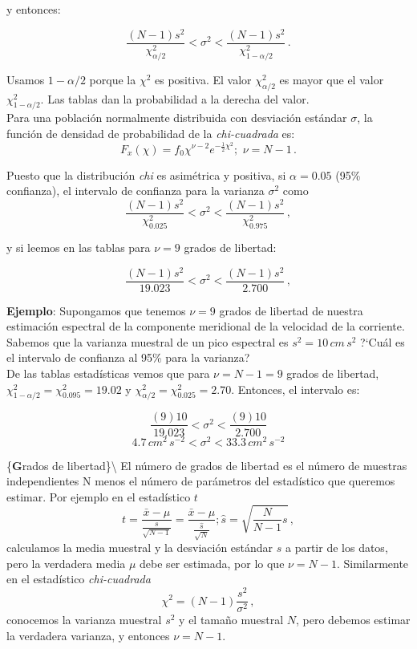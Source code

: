 \documentclass[
]{agujournal2019}
\begin{document}
y entonces:

\[\frac{(N-1)s^2}{\chi^2_{\alpha/2}}<\sigma^2<\frac{(N-1)s^2}{\chi^2_{1-\alpha/2}}\,.\]

\begin{center}
\end{center}

Usamos \(1-{\alpha/2}\) porque la \(\chi^2\) es positiva. El valor
\(\chi^2_{\alpha/2}\) es mayor que el valor \(\chi^2_{1-\alpha/2}\). Las
tablas dan la probabilidad a la derecha del valor.\\
Para una población normalmente distribuida con desviación estándar
\(\sigma\), la función de densidad de probabilidad de la
\emph{chi-cuadrada} es:
\[F_x(\chi)=f_0\chi^{\nu-2}e^{-\frac{1}{2}\chi^2};\,\,\nu=N-1\,.\]

Puesto que la distribución \emph{chi} es asimétrica y positiva, si
\(\alpha=0.05\) (95\% confianza), el intervalo de confianza para la
varianza \(\sigma^2\) como
\[\frac{(N-1)s^2}{\chi^2_{0.025}}<\sigma^2<\frac{(N-1)s^2}{\chi^2_{0.975}}\,,\]

y si leemos en las tablas para \(\nu=9\) grados de libertad:

\[\frac{(N-1)s^2}{19.023}<\sigma^2<\frac{(N-1)s^2}{2.700}\,,\]

\textbf{Ejemplo}: Supongamos que tenemos \(\nu=9\) grados de libertad de
nuestra estimación espectral de la componente meridional de la velocidad
de la corriente. Sabemos que la varianza muestral de un pico espectral
es \(s^2=10\,{ cm}\,{ s}^2\) ?{}`Cuál es el intervalo de confianza al
95\% para la varianza?\\

De las tablas estadísticas vemos que para \(\nu=N-1=9\) grados de
libertad, \(\chi^2_{1-\alpha/2}=\chi^2_{0.095}=19.02\) y
\(\chi^2_{\alpha/2}=\chi^2_{0.025}=2.70\). Entonces, el intervalo es:

\[\frac{(9)10}{19.023}<\sigma^2<\frac{(9)10}{2.700}\]
\[4.7\,{ cm}^2\,{ s}^{-2}<\sigma^2<33.3\,{ cm}^2\,{ s}^{-2}\]

\vspace{0.5cm}

\{\noindent \textbf Grados de libertad\}\textbackslash{} El número de
grados de libertad es el número de muestras independientes N menos el
número de parámetros del estadístico que queremos estimar. Por ejemplo
en el estadístico \(t\)
\[t=\frac{\bar{x}-\mu}{\frac{s}{\sqrt{N-1}}}=\frac{\bar{x}-\mu}{\frac{\hat{s}}{\sqrt{N}}};
\hat{s}=\sqrt{\frac{N}{N-1}s}\,,\] calculamos la media muestral y la
desviación estándar \(s\) a partir de los datos, pero la verdadera media
\(\mu\) debe ser estimada, por lo que \(\nu=N-1\). Similarmente en el
estadístico \emph{chi-cuadrada} \[\chi^2=(N-1)\frac{s^2}{\sigma^2}\,,\]
conocemos la varianza muestral \(s^2\) y el tamaño muestral \(N\), pero
debemos estimar la verdadera varianza, y entonces \(\nu=N-1\).
\end{document}
